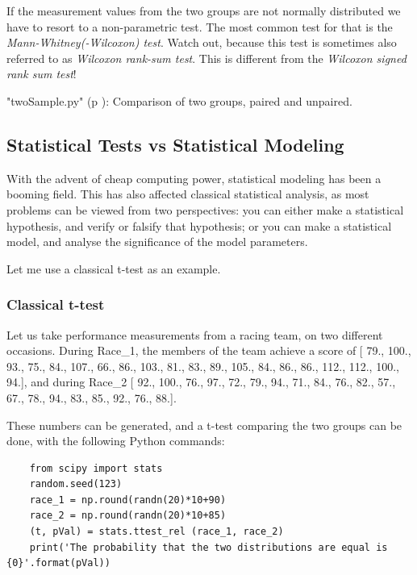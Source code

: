 If the measurement values from the two groups are not normally distributed we have to resort to a non-parametric test. The most common test for that is the \emph{Mann-Whitney(-Wilcoxon) test}. Watch out, because this test is sometimes also referred to as \emph{Wilcoxon rank-sum test}. This is different from the \emph{Wilcoxon signed rank sum test}!

\PyImg "twoSample.py" (p \pageref{py:twoSample}): Comparison of two groups, paired and unpaired.

\subsection{Statistical Tests vs Statistical Modeling}

With the advent of cheap computing power, statistical modeling has been a booming field. This has also affected classical statistical analysis, as most problems can be viewed from two perspectives: you can either make a statistical hypothesis, and verify or falsify that hypothesis; or you can make a statistical model, and analyse the significance of the model parameters.

Let me use a classical t-test as an example.

\subsubsection{Classical t-test}

Let us take performance measurements from a racing team, on two different occasions. During Race\_1, the members of the team achieve a score of [ 79.,  100.,   93.,   75.,   84.,  107.,   66.,   86.,  103.,
         81.,   83.,   89.,  105.,   84.,   86.,   86.,  112.,  112.,
        100.,   94.], and during Race\_2 [  92.,  100.,   76.,   97.,   72.,   79.,   94.,   71.,   84.,
         76.,   82.,   57.,   67.,   78.,   94.,   83.,   85.,   92.,
         76.,   88.].

These numbers can be generated, and a t-test comparing the two groups can be done, with the following Python commands:

\begin{lstlisting}
    from scipy import stats
    random.seed(123)
    race_1 = np.round(randn(20)*10+90)
    race_2 = np.round(randn(20)*10+85)
    (t, pVal) = stats.ttest_rel (race_1, race_2)
    print('The probability that the two distributions are equal is {0}'.format(pVal))
\end{lstlisting}

